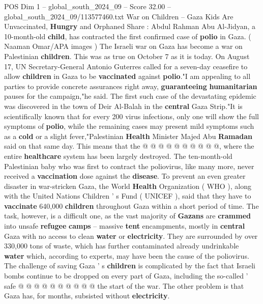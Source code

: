 \begin{textsample}{POS Dim 1 – global\_south\_2024\_09 – Score 32.00 – global\_south\_2024\_09/113577460.txt}  \label{ex:f1_pos_201}
War on Children -- Gaza Kids Are Unvaccinated, \textbf{Hungry} and Orphaned Share : Abdul Rahman Abu Al-Jidyan, a 10-month-old \textbf{child}, has contracted the first confirmed case of \textbf{polio} in Gaza. ( Naaman Omar/APA images ) The Israeli war on Gaza has become a war on Palestinian \textbf{children}.
This was as true on October 7 as it is today.
On August 17, UN Secretary-General Antonio Guterres called for a seven-day ceasefire to allow \textbf{children} in Gaza to be \textbf{vaccinated} against \textbf{polio}."I am appealing to all parties to provide concrete assurances right away, \textbf{guaranteeing} \textbf{humanitarian} pauses for the campaign,"he said.
The first such case of the devastating epidemic was discovered in the town of Deir Al-Balah in the \textbf{central} Gaza Strip."It is scientifically known that for every 200 virus infections, only one will show the full symptoms of \textbf{polio}, while the remaining cases may present mild symptoms such as a \textbf{cold} or a slight fever,"Palestinian \textbf{Health} Minister Majed Abu \textbf{Ramadan} said on that same day.
This means that the @ @ @ @ @ @ @ @ @ @, where the entire \textbf{healthcare} system has been largely destroyed.
The ten-month-old Palestinian baby who was first to contract the poliovirus, like many more, never received a \textbf{vaccination} dose against the \textbf{disease}.
To prevent an even greater disaster in war-stricken Gaza, the World \textbf{Health} Organization ( WHO ), along with the United Nations Children ' s Fund ( UNICEF ), said that they have to \textbf{vaccinate} 640,000 \textbf{children} throughout Gaza within a short period of time.
The task, however, is a difficult one, as the vast majority of \textbf{Gazans} are \textbf{crammed} into unsafe \textbf{refugee} \textbf{camps} -- massive \textbf{tent} encampments, mostly in \textbf{central} Gaza with no access to clean \textbf{water} or \textbf{electricity}.
They are surrounded by over 330,000 tons of waste, which has further contaminated already undrinkable \textbf{water} which, according to experts, may have been the cause of the poliovirus.
The challenge of saving Gaza ' s \textbf{children} is complicated by the fact that Israeli bombs continue to be dropped on every part of Gaza, including the so-called ' safe @ @ @ @ @ @ @ @ @ @ the start of the war.
The other problem is that Gaza has, for months, subsisted without \textbf{electricity}.

\end{textsample}

